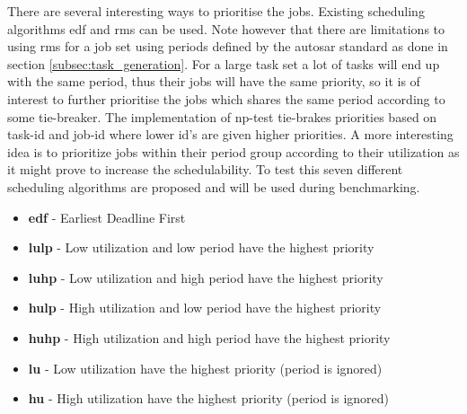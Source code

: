 \documentclass{kththesis}
\begin{document}
There are several interesting ways to prioritise the jobs. Existing scheduling algorithms
\acrshort{edf} and \acrshort{rms} can be used. Note however that there are limitations to using
\acrshort{rms} for a job set using periods defined by the \acrshort{autosar} standard as done in
section \ref{subsec:task_generation}. For a large task set a lot of tasks will end up with the same
period, thus their jobs will have the same priority, so it is of interest to further prioritise the
jobs which shares the same period according to some tie-breaker. The implementation of
\acrshort{np}-test tie-brakes priorities based on task-id and job-id where lower id's are given
higher priorities. A more interesting idea is to prioritize jobs within their period group according
to their utilization as it might prove to increase the schedulability. To test this seven different
scheduling algorithms are proposed and will be used during benchmarking.

\begin{itemize}
    \item \textbf{\acrshort{edf}} - Earliest Deadline First
    \item \textbf{\acrshort{lulp}} - Low utilization and low period have the highest priority
    \item \textbf{\acrshort{luhp}} - Low utilization and high period have the highest priority
    \item \textbf{\acrshort{hulp}} - High utilization and low period have the highest priority
    \item \textbf{\acrshort{huhp}} - High utilization and high period have the highest priority
    \item \textbf{\acrshort{lu}} - Low utilization have the highest priority (period is ignored)
    \item \textbf{\acrshort{hu}} - High utilization have the highest priority (period is ignored)
\end{itemize}
\end{document}
